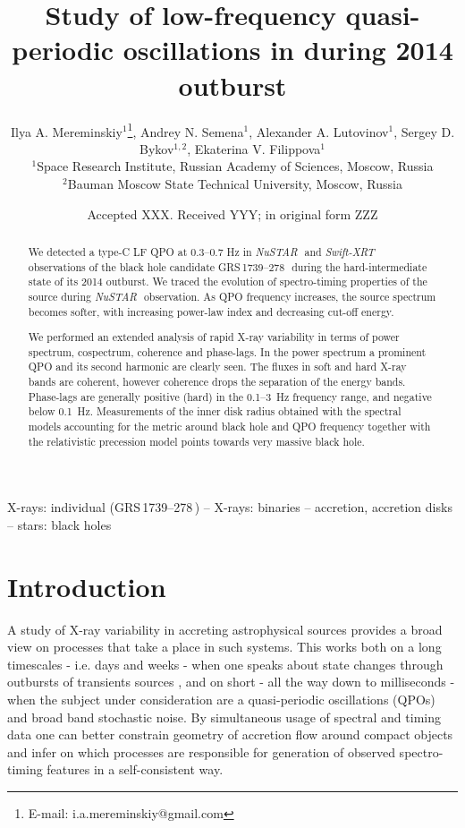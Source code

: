 \documentclass[a4paper,fleqn,usenatbib]{mnras}
\title[Study of low-frequency QPO in  \grs]{Study of low-frequency quasi-periodic oscillations in \grs during 2014 outburst}
\author[I. A. Mereminskiy et al.]{
Ilya A. Mereminskiy$^{1}$\thanks{E-mail: i.a.mereminskiy@gmail.com},
Andrey N. Semena$^{1}$,
Alexander A. Lutovinov$^{1}$,\newauthor
Sergey D. Bykov$^{1,2}$,
Ekaterina V. Filippova$^{1}$
\\
$^{1}$Space Research Institute, Russian Academy of Sciences, Moscow, Russia\\
$^{2}$Bauman Moscow State Technical University, Moscow, Russia\\
}
\date{Accepted XXX. Received YYY; in original form ZZZ}
\def\grs{{GRS\,1739--278\,}}
\def\swiftx{{\em Swift-XRT\,}}
\def\nustar{{\em NuSTAR\,}}
\begin{document}
\label{firstpage}
\pagerange{\pageref{firstpage}--\pageref{lastpage}}
\maketitle

\begin{abstract}
We detected a type-C LF QPO at 0.3--0.7 Hz in \nustar\, and \swiftx\, observations of the black hole candidate \grs\, during the hard-intermediate state of its 2014 outburst. We traced the evolution of spectro-timing properties of the source during \nustar\, observation. 
As QPO frequency increases, the source spectrum becomes softer, with increasing power-law index and decreasing cut-off energy.

We performed an extended analysis of rapid X-ray variability in terms of power spectrum, cospectrum, coherence and phase-lags. 
In the power spectrum a prominent QPO and its second harmonic are clearly seen. 
The fluxes in soft and hard X-ray bands are coherent, however coherence drops the separation of the energy bands. 
Phase-lags are generally positive (hard) in the 0.1--3~Hz frequency range, and negative below 0.1~Hz.
Measurements of the inner disk radius obtained with the spectral models accounting for the metric around black hole and QPO frequency together with the relativistic precession model points towards very massive black hole.
\end{abstract}

\begin{keywords}
X-rays: individual (\grs) -- X-rays: binaries -- accretion, accretion disks  -- stars: black holes
\end{keywords}


\section{Introduction}
\label{sec:intro} 
A study of X-ray variability in accreting astrophysical sources provides a broad view on processes that take a place in such systems. 
This works both on a long timescales - i.e. days and weeks - when one speaks about state changes through outbursts of transients sources \citep[see e.g.][]{homan05, heil15}, and on short - all the way down to milliseconds - when the subject under consideration are a quasi-periodic oscillations (QPOs) and broad band stochastic noise. 
By simultaneous usage of spectral and timing data one can better constrain geometry of accretion flow around compact objects and infer on which processes are responsible for generation of observed spectro-timing features in a self-consistent way.
\end{document}
